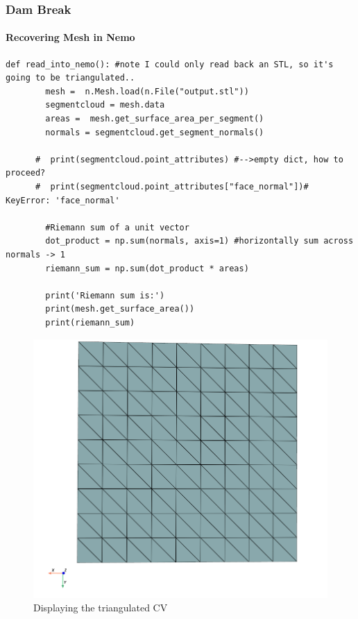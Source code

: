 \documentclass[notheorems, aspectratio=169]{beamer}
\begin{document}
  \begin{frame}[fragile]
    \frametitle{Dam Break}
    \framesubtitle{Recovering Mesh in Nemo}
    
    \begin{lstlisting}[style = python]
    def read_into_nemo(): #note I could only read back an STL, so it's going to be triangulated..
        mesh =  n.Mesh.load(n.File("output.stl"))
        segmentcloud = mesh.data
        areas =  mesh.get_surface_area_per_segment()
        normals = segmentcloud.get_segment_normals()
  
      #  print(segmentcloud.point_attributes) #-->empty dict, how to proceed?
      #  print(segmentcloud.point_attributes["face_normal"])# KeyError: 'face_normal'
        
        #Riemann sum of a unit vector
        dot_product = np.sum(normals, axis=1) #horizontally sum across normals -> 1
        riemann_sum = np.sum(dot_product * areas)
      
        print('Riemann sum is:')
        print(mesh.get_surface_area())
        print(riemann_sum)
    \end{lstlisting}
    
  \end{frame}

  
  \begin{frame}

    
    \begin{figure}
      \centering
      \includegraphics[width=0.5\linewidth]{pictures/control_volume.png} 
      \caption{Displaying the triangulated CV}
    \end{figure}
  
  \end{frame}
  
\end{document}

